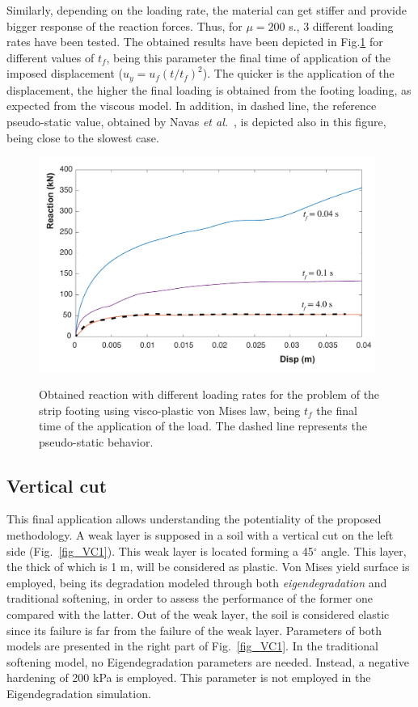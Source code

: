 \documentclass[applsci,journal,article,submit,moreauthors,pdftex]{Definitions/mdpi}
\begin{document}
Similarly, depending on the loading rate, the material can get stiffer and provide bigger response of the reaction forces. Thus, for $\mu=200$ s., 3 different loading rates have been tested. The obtained results have been depicted in Fig.\ref{visco2} for different values of $t_f$, being this parameter the final time of application of the imposed displacement ($u_y=u_f\left(t/t_f\right)^2$). The quicker is the application of the displacement, the higher the final loading is obtained from the footing loading, as expected from the viscous model. In addition, in dashed line, the reference pseudo-static value, obtained by Navas \textit{et al.}~\cite{Navas2018}, is depicted also in this figure, being close to the slowest case.

\begin{figure}
\begin{center}
\includegraphics[width=11cm]{Figs/visco_t.pdf}\\
\caption{Obtained reaction with different loading rates for the problem of the strip footing using visco-plastic von Mises law, being $t_f$ the final time of the application of the load. The dashed line represents the pseudo-static behavior.}
\label{visco2}
\end{center}
\end{figure}

\subsection{Vertical cut}
This final application allows understanding the potentiality of the proposed methodology. A weak layer is supposed in a soil with a vertical cut on the left side (Fig.~\ref{fig_VC1}). This weak layer is located forming a 45$^\circ$ angle. This layer, the thick of which is 1 m, will be considered as plastic. Von Mises yield surface is employed, being its degradation modeled through both \emph{eigendegradation} and traditional softening, in order to assess the performance of the former one compared with the latter. Out of the weak layer, the soil is considered elastic since its failure is far from the failure of the weak layer. Parameters of both models are presented in the right part of Fig.~\ref{fig_VC1}. In the traditional softening model, no Eigendegradation parameters are needed. Instead, a negative hardening of 200 kPa is employed. This parameter is not employed in the Eigendegradation simulation.
\end{document}
